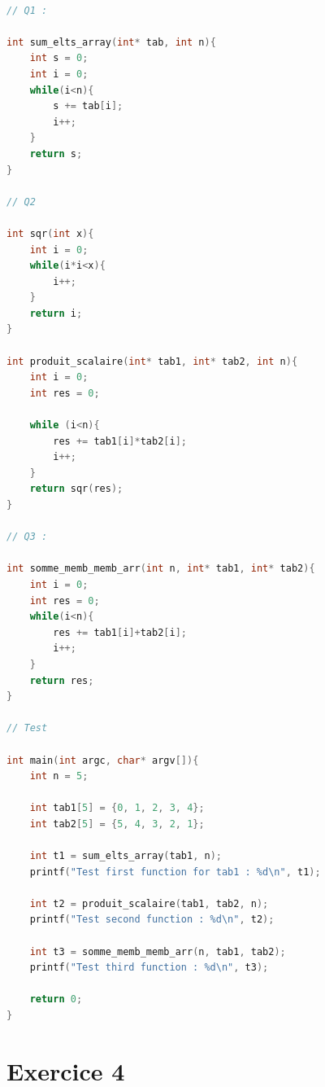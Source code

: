 \documentclass{article}
\begin{document}
\begin{lstlisting}[language=C, caption={Exercices Array}]
    
// Q1 : 

int sum_elts_array(int* tab, int n){
    int s = 0; 
    int i = 0; 
    while(i<n){
        s += tab[i]; 
        i++; 
    }
    return s; 
}

// Q2 

int sqr(int x){
    int i = 0; 
    while(i*i<x){
        i++; 
    }
    return i; 
}

int produit_scalaire(int* tab1, int* tab2, int n){
    int i = 0; 
    int res = 0; 

    while (i<n){
        res += tab1[i]*tab2[i]; 
        i++; 
    }
    return sqr(res); 
}

// Q3 : 

int somme_memb_memb_arr(int n, int* tab1, int* tab2){
    int i = 0; 
    int res = 0; 
    while(i<n){
        res += tab1[i]+tab2[i]; 
        i++; 
    }
    return res; 
}

// Test 

int main(int argc, char* argv[]){
    int n = 5; 

    int tab1[5] = {0, 1, 2, 3, 4};
    int tab2[5] = {5, 4, 3, 2, 1};

    int t1 = sum_elts_array(tab1, n); 
    printf("Test first function for tab1 : %d\n", t1); 

    int t2 = produit_scalaire(tab1, tab2, n); 
    printf("Test second function : %d\n", t2); 

    int t3 = somme_memb_memb_arr(n, tab1, tab2); 
    printf("Test third function : %d\n", t3);

    return 0; 
}
\end{lstlisting}

\section*{\textbf{Exercice 4}}
\end{document}
